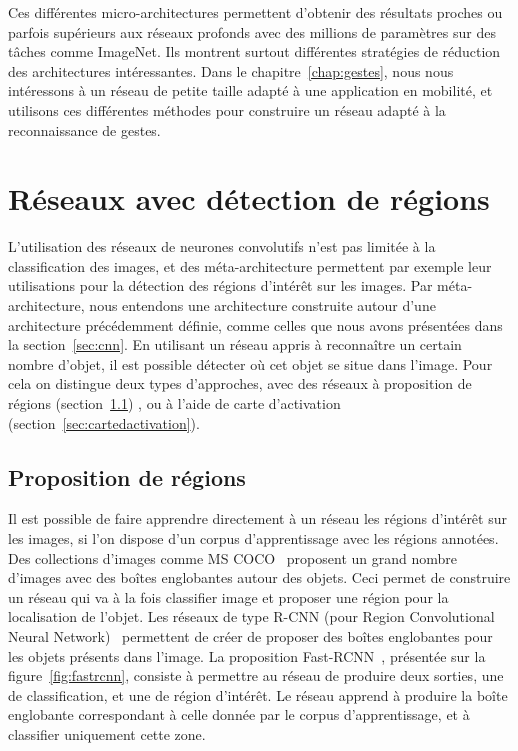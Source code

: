 Ces différentes micro-architectures permettent d'obtenir des résultats proches ou parfois supérieurs aux réseaux profonds avec des millions de paramètres sur des tâches comme ImageNet.
Ils montrent surtout différentes stratégies de réduction des architectures intéressantes.
Dans le chapitre~\ref{chap:gestes}, nous nous intéressons à un réseau de petite taille adapté à une application en mobilité, et utilisons ces différentes méthodes pour construire un réseau adapté à la reconnaissance de gestes. 


\section{Réseaux avec détection de régions}
\label{sec:rpn}

L'utilisation des réseaux de neurones convolutifs n'est pas limitée à la classification des images, et des méta-architecture permettent par exemple leur utilisations pour la détection des régions d'intérêt sur les images. 
Par méta-architecture, nous entendons une architecture construite autour d'une architecture précédemment définie, comme celles que nous avons présentées dans la section~\ref{sec:cnn}.
En utilisant un réseau appris à reconnaître un certain nombre d'objet, il est possible détecter où cet objet se situe dans l'image.
Pour cela on distingue deux types d'approches, avec des réseaux à proposition de régions (section~\ref{sec:propositionderegions}) , ou à l'aide de carte d'activation (section~\ref{sec:cartedactivation}).


\subsection{Proposition de régions}
\label{sec:propositionderegions}

Il est possible de faire apprendre directement à un réseau les régions d'intérêt sur les images, si l'on dispose d'un corpus d'apprentissage avec les régions annotées.
Des collections d'images comme MS COCO~\cite{lin2014microsoft} proposent un grand nombre d'images avec des boîtes englobantes autour des objets.
Ceci permet de construire un réseau qui va à la fois classifier image et proposer une région pour la localisation de l'objet.
Les réseaux de type R-CNN (pour Region Convolutional Neural Network)~\cite{girshick2014rich} permettent de créer de proposer des boîtes englobantes pour les objets présents dans l'image.
La proposition Fast-RCNN~\cite{girshick2015fast}, présentée sur la figure~\ref{fig:fastrcnn}, consiste à permettre au réseau de produire deux sorties, une de classification, et une de région d'intérêt. 
Le réseau apprend à produire la boîte englobante correspondant à celle donnée par le corpus d'apprentissage, et à classifier uniquement cette zone.


